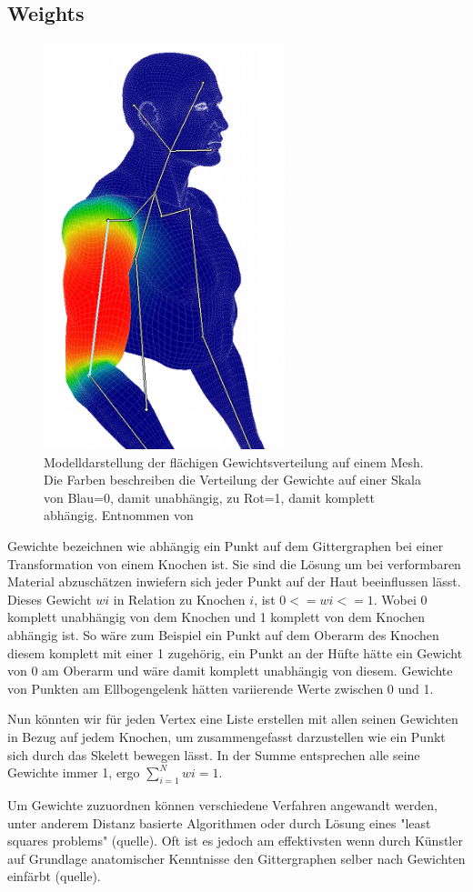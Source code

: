 \subsection{Weights}
\begin{figure}[t]
	\includegraphics[width=7cm]{01_Skinning/pics/weight.png}
	\caption[Flächige Gewichtsverteilung]{ Modelldarstellung der flächigen Gewichtsverteilung auf einem Mesh. Die Farben beschreiben die Verteilung der Gewichte auf einer Skala von Blau=0, damit unabhängig, zu Rot=1, damit komplett abhängig. Entnommen von}
	\label{weights_fig1}
\end{figure}

Gewichte bezeichnen wie abhängig ein Punkt auf dem Gittergraphen bei einer Transformation von einem Knochen ist. Sie sind die Lösung um bei verformbaren Material abzuschätzen inwiefern sich jeder Punkt auf der Haut beeinflussen lässt. Dieses Gewicht $wi$ in Relation zu Knochen $i$, ist $0<=wi<=1$. Wobei 0 komplett unabhängig von dem Knochen und 1 komplett von dem Knochen abhängig ist. So wäre zum Beispiel ein Punkt auf dem Oberarm des Knochen diesem komplett mit einer 1 zugehörig, ein Punkt an der Hüfte hätte ein Gewicht von 0 am Oberarm und wäre damit komplett unabhängig von diesem. Gewichte von Punkten am Ellbogengelenk hätten variierende Werte zwischen 0 und 1. 

Nun könnten wir für jeden Vertex eine Liste erstellen mit allen seinen Gewichten in Bezug auf jedem Knochen, um zusammengefasst darzustellen wie ein Punkt sich durch das Skelett bewegen lässt. In der Summe entsprechen alle seine Gewichte immer 1, ergo $\sum_{i=1}^{N}wi=1$.

Um Gewichte zuzuordnen können verschiedene Verfahren angewandt werden, unter anderem Distanz basierte Algorithmen oder durch Lösung eines "least squares problems" (quelle). Oft ist es jedoch am effektivsten wenn durch Künstler auf Grundlage anatomischer Kenntnisse den Gittergraphen selber nach Gewichten einfärbt (quelle).